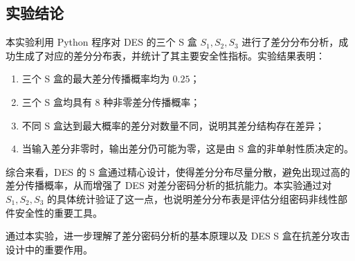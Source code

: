 \subsection{实验结论}
本实验利用 Python 程序对 DES 的三个 S 盒 $S_1,S_2,S_3$ 进行了差分分布分析，成功生成了对应的差分分布表，并统计了其主要安全性指标。实验结果表明：

\begin{enumerate}
    \item 三个 S 盒的最大差分传播概率均为 $0.25$；
    \item 三个 S 盒均具有 8 种非零差分传播概率；
    \item 不同 S 盒达到最大概率的差分对数量不同，说明其差分结构存在差异；
    \item 当输入差分非零时，输出差分仍可能为零，这是由 S 盒的非单射性质决定的。
\end{enumerate}
\par\indent 综合来看，DES 的 S 盒通过精心设计，使得差分分布尽量分散，避免出现过高的差分传播概率，从而增强了 DES 对差分密码分析的抵抗能力。本实验通过对 $S_1,S_2,S_3$ 的具体统计验证了这一点，也说明差分分布表是评估分组密码非线性部件安全性的重要工具。

\par\indent 通过本实验，进一步理解了差分密码分析的基本原理以及 DES S 盒在抗差分攻击设计中的重要作用。
